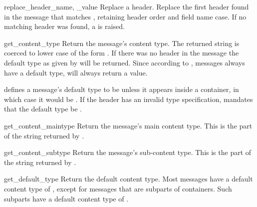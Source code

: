 \begin{methoddesc}[Message]{replace_header}{_name, _value}
Replace a header.  Replace the first header found in the message that
matches , retaining header order and field name case.  If
no matching header was found, a  is raised.

\end{methoddesc}

\begin{methoddesc}[Message]{get_content_type}{}
Return the message's content type.  The returned string is coerced to
lower case of the form .  If there was no
 header in the message the default type as
given by  will be returned.  Since
according to , messages always have a default type,
 will always return a value.

 defines a message's default type to be
 unless it appears inside a
 container, in which case it would be
.  If the  header
has an invalid type specification,  mandates that the
default type be .

\end{methoddesc}

\begin{methoddesc}[Message]{get_content_maintype}{}
Return the message's main content type.  This is the
 part of the string returned by
.

\end{methoddesc}

\begin{methoddesc}[Message]{get_content_subtype}{}
Return the message's sub-content type.  This is the 
part of the string returned by .

\end{methoddesc}

\begin{methoddesc}[Message]{get_default_type}{}
Return the default content type.  Most messages have a default content
type of , except for messages that are subparts
of  containers.  Such subparts have a
default content type of .

\end{methoddesc}

